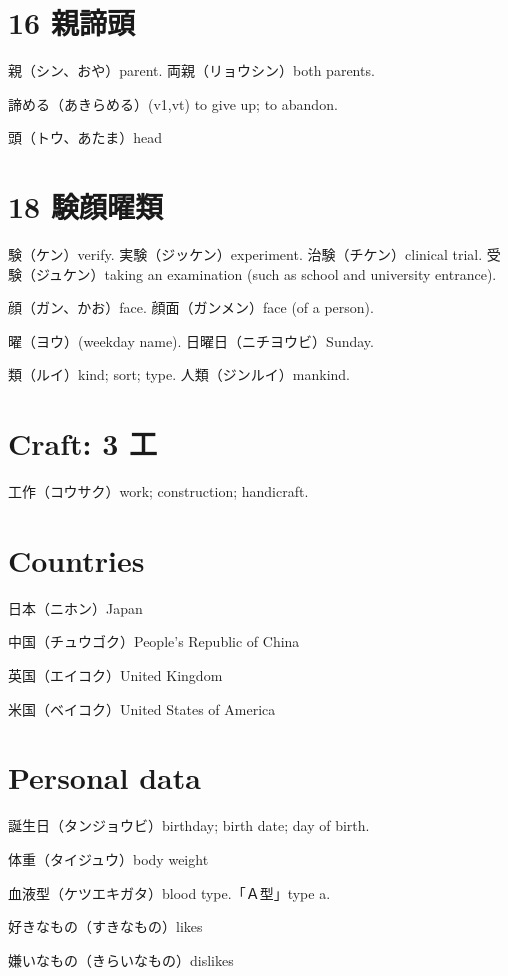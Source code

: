 \section{16 親諦頭}

親（シン、おや）parent.
両親（リョウシン）both parents.

諦める（あきらめる）(v1,vt)
to give up; to abandon.

頭（トウ、あたま）head

\section{18 験顔曜類}

験（ケン）verify.
実験（ジッケン）experiment.
治験（チケン）clinical trial.
受験（ジュケン）taking an examination (such as school and university entrance).

顔（ガン、かお）face.
顔面（ガンメン）face (of a person).

曜（ヨウ）(weekday name).
日曜日（ニチヨウビ）Sunday.

類（ルイ）kind; sort; type.
人類（ジンルイ）mankind.

\section{Craft: 3 工}

工作（コウサク）work; construction; handicraft.

\section{Countries}

日本（ニホン）Japan

中国（チュウゴク）People's Republic of China

英国（エイコク）United Kingdom

米国（ベイコク）United States of America

\section{Personal data}

誕生日（タンジョウビ）birthday; birth date; day of birth.

体重（タイジュウ）body weight

血液型（ケツエキガタ）blood type.「Ａ型」type a.

好きなもの（すきなもの）likes

嫌いなもの（きらいなもの）dislikes

